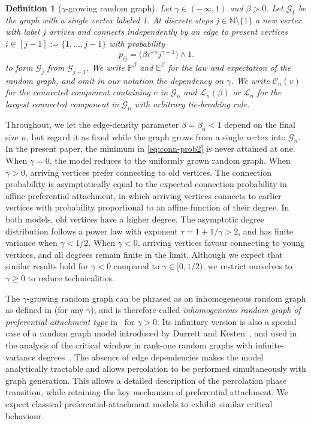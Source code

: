 \documentclass[a4paper, a4wide, 10pt, reqno]{amsart}
\theoremstyle{plain}
\newtheorem{definition}[theorem]{Definition}
\theoremstyle{definition}
\numberwithin{equation}{section}
\newcommand{\N}{{\mathbb N}}
\newcommand{\E}{\mathbb E}
\newcommand{\Prob}{\mathbb{P}}
\newcommand{\sC}{{\mathscr C}}
\newcommand{\sG}{{\mathscr G}}
\newcommand{\sL}{{\mathscr L}}
\begin{document}
\begin{definition}[$\gamma$-growing random graph]\label{def:pa-ann}
	Let $\gamma\in(-\infty,1)$ and $\beta>0$. Let $\sG_1$ be the graph with a single vertex labeled 1. At discrete steps  $j\in\N\setminus\{1\}$ a new vertex with label $j$ arrives and connects independently by an edge to present vertices $i\in[j-1]:=\{1,\ldots,j-1\}$  with probability
    \begin{equation}\label{eq:conn-prob2}
     p_{ij} = \big(\beta i^{-\gamma}j^{\gamma-1}\big)\wedge 1.
    \end{equation}
	to form $\sG_j$ from $\sG_{j-1}$. 
    We write $\Prob^{\beta}$ and $\E^\beta$ for the law and expectation of the random graph, and omit in our notation the dependency on $\gamma$.
    We write $\sC_n(v)$ for the connected component containing $v$ in $\sG_n$ and $\sL_n(\beta)$ or $\sL_n$ for the largest connected component in $\sG_n$ with arbitrary tie-breaking rule. 
    \end{definition}
    Throughout, we let the edge-density parameter $\beta=\beta_n<1$ depend on the final size $n$, but regard it as fixed while the graph grows from a single vertex into $\sG_n$. In the present paper, the minimum in \eqref{eq:conn-prob2} is never attained at one. 
     When $\gamma=0$, the model reduces to the uniformly grown random graph. 
     When $\gamma > 0$, arriving vertices prefer connecting to old vertices. The connection probability is asymptotically equal to the expected connection probability in affine preferential attachment, in which arriving vertices connects to earlier vertices with probability proportional to an affine function of their degree. In both models, old vertices have a higher degree.   The asymptotic degree distribution follows a power law with exponent $\tau=1+1/\gamma>2$, and has finite variance when $\gamma<1/2$. When $\gamma<0$, arriving vertices favour connecting to young vertices, and all degrees remain finite in the limit. Although we expect that similar results hold for $\gamma<0$ compared to $\gamma\in[0,1/2)$, we restrict ourselves to $\gamma\ge 0$ to reduce  technicalities. 

     \smallskip 
     The $\gamma$-growing random graph can be phrased as an inhomogeneous random graph as defined in \cite{bollobasRiordanJanson2007} (for any $\gamma$), and is therefore called \emph{inhomogeneous random graph of preferential-attachment type} in~\cite{MS24} for $\gamma>0$. Its infinitary version is also a special case of a random graph model introduced by Durrett and Kesten~\cite{durrett1990critical}, and used in the analysis of the critical window in rank-one random graphs with infinite-variance degrees~\cite{Bha24}.
The absence of edge dependencies makes the model analytically tractable and allows percolation to be performed simultaneously with graph generation.  This allows a detailed description of the percolation phase transition, while retaining the key mechanism of preferential attachment. We expect classical preferential-attachment models to exhibit similar critical behaviour.
\end{document}

